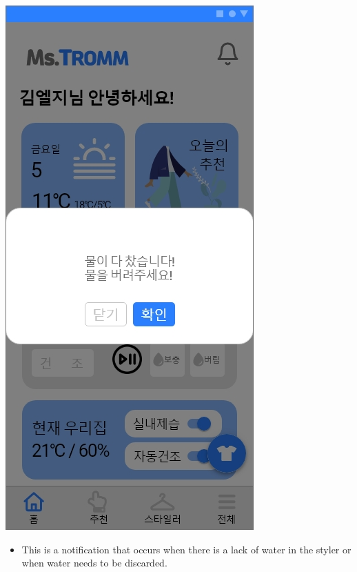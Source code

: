 \documentclass[conference]{IEEEtran}
\begin{document}
\begin{enumerate}
{            \includegraphics[scale=0.18]{assets/제어추천 팝업2.jpg}}
\break
    \begin{itemize}
    \item[] This is a notification that occurs when there is a lack of water in the styler or when water needs to be discarded. \\
\end{itemize}

\end{enumerate}
\end{document}
